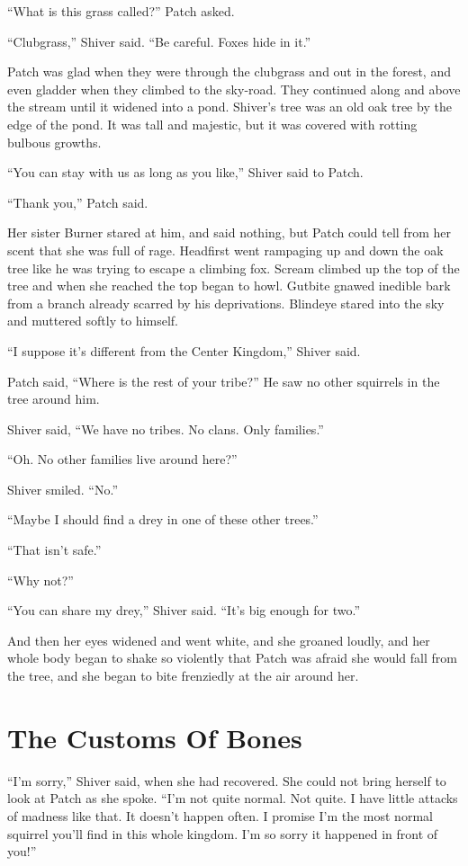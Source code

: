 \documentclass[12pt]{memoir}
\begin{document}
“What is this grass called?” Patch asked.

“Clubgrass,” Shiver said. “Be careful. Foxes hide in it.”

Patch was glad when they were through the clubgrass and out in the
forest, and even gladder when they climbed to the sky-road. They
continued along and above the stream until it widened into a
pond. Shiver’s tree was an old oak tree by the edge of the pond. It
was tall and majestic, but it was covered with rotting bulbous
growths.

“You can stay with us as long as you like,” Shiver said to Patch.

“Thank you,” Patch said.

Her sister Burner stared at him, and said nothing, but Patch could
tell from her scent that she was full of rage. Headfirst went
rampaging up and down the oak tree like he was trying to escape a
climbing fox. Scream climbed up the top of the tree and when she
reached the top began to howl. Gutbite gnawed inedible bark from a
branch already scarred by his deprivations. Blindeye stared into the
sky and muttered softly to himself.

“I suppose it’s different from the Center Kingdom,” Shiver said.

Patch said, “Where is the rest of your tribe?” He saw no other
squirrels in the tree around him.

Shiver said, “We have no tribes. No clans. Only families.”

“Oh. No other families live around here?”

Shiver smiled. “No.”

“Maybe I should find a drey in one of these other trees.”

“That isn’t safe.”

“Why not?”

“You can share my drey,” Shiver said. “It’s big enough for two.”

And then her eyes widened and went white, and she groaned loudly, and
her whole body began to shake so violently that Patch was afraid she
would fall from the tree, and she began to bite frenziedly at the air
around her.


\section{The Customs Of Bones}

“I’m sorry,” Shiver said, when she had recovered. She could not bring
herself to look at Patch as she spoke. “I’m not quite normal. Not
quite. I have little attacks of madness like that. It doesn’t happen
often. I promise I’m the most normal squirrel you’ll find in this
whole kingdom. I’m so sorry it happened in front of you!”
\end{document}
